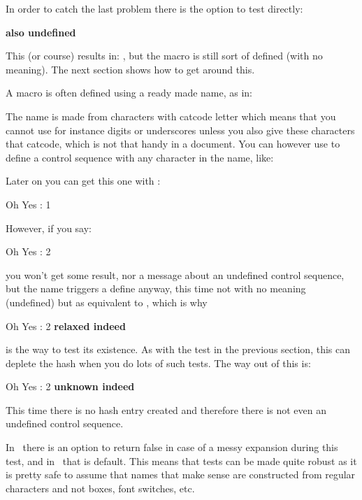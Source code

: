 In order to catch the last problem there is the option to test directly:

\startbuffer
\ifdefined\MyOtherMacro \else
    {\bf also undefined}
\fi
\stopbuffer

\typebuffer[option=TEX]

This (or course) results in: \inlinebuffer, but the macro is still sort of
defined (with no meaning). The next section shows how to get around this.

\stopsubsection

\startsubsection[title={\tex{ifcsname}}]

A macro is often defined using a ready made name, as in:

\starttyping[option=TEX]
\stoptyping

The name is made from characters with catcode letter which means that you cannot
use for instance digits or underscores unless you also give these characters that
catcode, which is not that handy in a document. You can however use \type
{\csname} to define a control sequence with any character in the name, like:

\starttyping[option=TEX]
\expandafter{}
\stoptyping

Later on you can get this one with \type {\csname}:

\starttyping[option=TEX]
\csname Oh Yes : 1\endcsname
\stoptyping

However, if you say:

\starttyping[option=TEX]
\csname Oh Yes : 2\endcsname
\stoptyping

you won't get some result, nor a message about an undefined control sequence, but
the name triggers a define anyway, this time not with no meaning (undefined) but
as equivalent to \type {\relax}, which is why

\starttyping[option=TEX]
\expandafter\ifx\csname Oh Yes : 2\endcsname\relax
    {\bf relaxed indeed}
\fi
\stoptyping

is the way to test its existence. As with the test in the previous section,
this can deplete the hash when you do lots of such tests. The way out of this
is:

\starttyping[option=TEX]
\ifcsname Oh Yes : 2\endcsname \else
    {\bf unknown indeed}
\fi
\stoptyping

This time there is no hash entry created and therefore there is not even an
undefined control sequence.

In \LUATEX\ there is an option to return false in case of a messy expansion
during this test, and in \LUAMETATEX\ that is default. This means that tests can
be made quite robust as it is pretty safe to assume that names that make sense
are constructed from regular characters and not boxes, font switches, etc.

